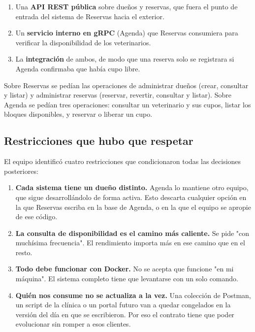 \documentclass[12pt, a4paper]{article}
\begin{document}
\begin{enumerate}[leftmargin=1.7cm]
    \item Una \textbf{API REST pública} sobre dueños y reservas, que fuera
    el punto de entrada del sistema de Reservas hacia el exterior.
    \item Un \textbf{servicio interno en gRPC} (Agenda) que Reservas
    consumiera para verificar la disponibilidad de los veterinarios.
    \item La \textbf{integración} de ambos, de modo que una reserva solo se
    registrara si Agenda confirmaba que había cupo libre.
\end{enumerate}

Sobre Reservas se pedían las operaciones de administrar dueños (crear,
consultar y listar) y administrar reservas (reservar, revertir, consultar
y listar). Sobre Agenda se pedían tres operaciones: consultar un
veterinario y sus cupos, listar los bloques disponibles, y reservar o
liberar un cupo.

\subsection{Restricciones que hubo que respetar}

El equipo identificó cuatro restricciones que condicionaron todas las
decisiones posteriores:

\begin{enumerate}[leftmargin=1.7cm]
    \item \textbf{Cada sistema tiene un dueño distinto.} Agenda lo mantiene
    otro equipo, que sigue desarrollándolo de forma activa. Esto descarta
    cualquier opción en la que Reservas escriba en la base de Agenda, o en
    la que el equipo se apropie de ese código.
    \item \textbf{La consulta de disponibilidad es el camino más
    caliente.} Se pide "con muchísima frecuencia". El rendimiento importa
    más en ese camino que en el resto.
    \item \textbf{Todo debe funcionar con Docker.} No se acepta que
    funcione "en mi máquina". El sistema completo tiene que levantarse con
    un solo comando.
    \item \textbf{Quién nos consume no se actualiza a la vez.} Una
    colección de Postman, un script de la clínica o un portal futuro van a
    quedar congelados en la versión del día en que se escribieron. Por eso
    el contrato tiene que poder evolucionar sin romper a esos clientes.
\end{enumerate}
\end{document}
